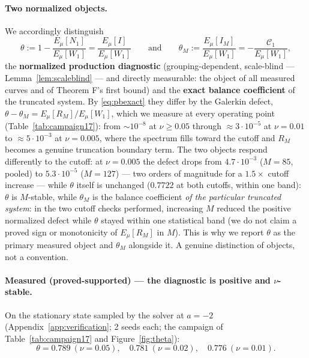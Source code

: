 \documentclass[11pt]{article}
\theoremstyle{remark}
\theoremstyle{plain}
\newcommand{\eqdef}{:=}
\begin{document}
\paragraph{Two normalized objects.} We accordingly distinguish
\begin{equation}
   \theta \eqdef 1 - \frac{E_\mu[N_1]}{E_\mu[W_1]} = \frac{E_\mu[I]}{E_\mu[W_1]}
   \qquad\text{and}\qquad
   \theta_M \eqdef \frac{E_\mu[I_M]}{E_\mu[W_1]} = -\frac{\mathcal{C}_1}{E_\mu[W_1]},
\end{equation}
the \textbf{normalized production diagnostic} (grouping-dependent, scale-blind ---
Lemma~\ref{lem:scaleblind} --- and directly measurable: the object of all measured
curves and of Theorem F's first bound) and the \textbf{exact balance coefficient} of
the truncated system. By \eqref{eq:pbexact} they differ by the Galerkin defect,
$\theta - \theta_M = E_\mu[R_M]/E_\mu[W_1]$, which we measure at every operating point
(Table~\ref{tab:campaign17}): from $\sim10^{-8}$ at $\nu \ge 0.05$ through
$\approx 3\cdot10^{-5}$ at $\nu = 0.01$ to $\approx 5\cdot10^{-3}$ at $\nu = 0.005$,
where the spectrum fills toward the cutoff and $R_M$ becomes a genuine truncation
boundary term. The two objects respond differently to the cutoff: at $\nu = 0.005$ the defect drops
from $4.7\cdot10^{-3}$ ($M = 85$, pooled) to $5.3\cdot10^{-5}$ ($M = 127$) --- two orders of
magnitude for a $1.5\times$ cutoff increase --- while $\theta$ itself is unchanged
($0.7722$ at both cutoffs, within one band): $\theta$ is $M$-stable, while $\theta_M$ is the
balance coefficient \emph{of the particular truncated system}: in the two cutoff
checks performed, increasing $M$ reduced the positive normalized defect while $\theta$
stayed within one statistical band (we do not claim a proved sign or monotonicity of
$E_\mu[R_M]$ in $M$). This is why we report $\theta$ as the primary measured
object and $\theta_M$ alongside it. A genuine distinction of objects, not a convention.

\paragraph{Measured (proved-supported) --- the diagnostic is positive and
$\nu$-stable.} On the stationary state sampled by the solver at $a=-2$ (Appendix~\ref{app:verification};
2 seeds each; the campaign of Table~\ref{tab:campaign17} and
Figure~\ref{fig:theta}):
\begin{equation}
   \theta = 0.789\ (\nu=0.05), \quad 0.781\ (\nu=0.02), \quad 0.776\ (\nu=0.01).
\end{equation}
\end{document}
